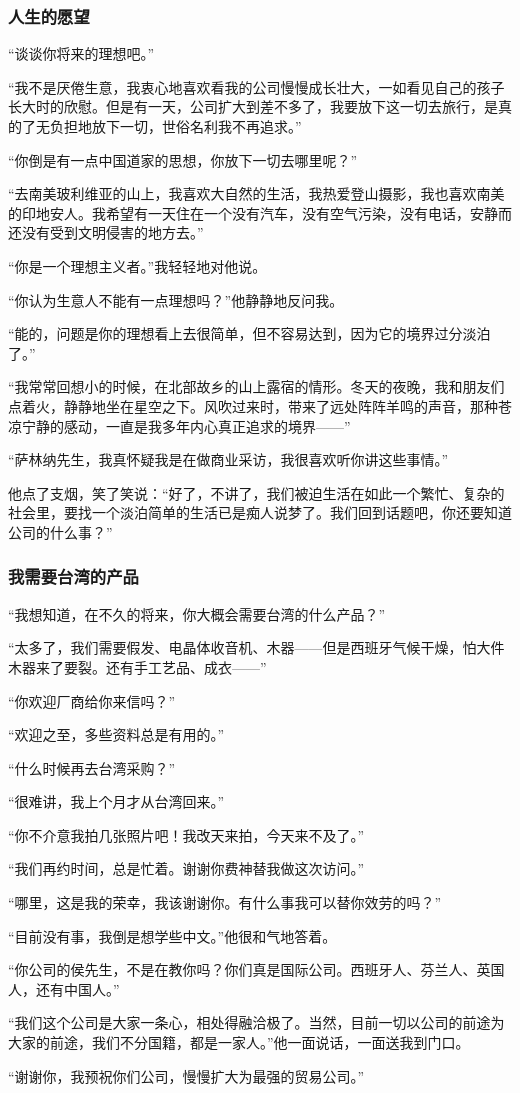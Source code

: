 \subsubsection*{人生的愿望}
\par “谈谈你将来的理想吧。”
\par “我不是厌倦生意，我衷心地喜欢看我的公司慢慢成长壮大，一如看见自己的孩子长大时的欣慰。但是有一天，公司扩大到差不多了，我要放下这一切去旅行，是真的了无负担地放下一切，世俗名利我不再追求。”
\par “你倒是有一点中国道家的思想，你放下一切去哪里呢？”
\par “去南美玻利维亚的山上，我喜欢大自然的生活，我热爱登山摄影，我也喜欢南美的印地安人。我希望有一天住在一个没有汽车，没有空气污染，没有电话，安静而还没有受到文明侵害的地方去。”
\par “你是一个理想主义者。”我轻轻地对他说。
\par “你认为生意人不能有一点理想吗？”他静静地反问我。
\par “能的，问题是你的理想看上去很简单，但不容易达到，因为它的境界过分淡泊了。”
\par “我常常回想小的时候，在北部故乡的山上露宿的情形。冬天的夜晚，我和朋友们点着火，静静地坐在星空之下。风吹过来时，带来了远处阵阵羊鸣的声音，那种苍凉宁静的感动，一直是我多年内心真正追求的境界——”
\par “萨林纳先生，我真怀疑我是在做商业采访，我很喜欢听你讲这些事情。”
\par 他点了支烟，笑了笑说：“好了，不讲了，我们被迫生活在如此一个繁忙、复杂的社会里，要找一个淡泊简单的生活已是痴人说梦了。我们回到话题吧，你还要知道公司的什么事？”
\subsubsection*{我需要台湾的产品}
\par “我想知道，在不久的将来，你大概会需要台湾的什么产品？”
\par “太多了，我们需要假发、电晶体收音机、木器——但是西班牙气候干燥，怕大件木器来了要裂。还有手工艺品、成衣——”
\par “你欢迎厂商给你来信吗？”
\par “欢迎之至，多些资料总是有用的。”
\par “什么时候再去台湾采购？”
\par “很难讲，我上个月才从台湾回来。”
\par “你不介意我拍几张照片吧！我改天来拍，今天来不及了。”
\par “我们再约时间，总是忙着。谢谢你费神替我做这次访问。”
\par “哪里，这是我的荣幸，我该谢谢你。有什么事我可以替你效劳的吗？”
\par “目前没有事，我倒是想学些中文。”他很和气地答着。
\par “你公司的侯先生，不是在教你吗？你们真是国际公司。西班牙人、芬兰人、英国人，还有中国人。”
\par “我们这个公司是大家一条心，相处得融洽极了。当然，目前一切以公司的前途为大家的前途，我们不分国籍，都是一家人。”他一面说话，一面送我到门口。
\par “谢谢你，我预祝你们公司，慢慢扩大为最强的贸易公司。”
